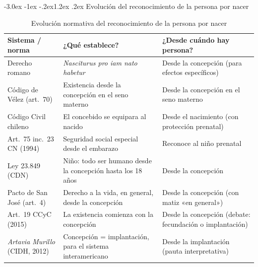 \documentclass[12pt,oneside]{book}
\makeatletter
\renewcommand\section{\@startsection{section}{1}{\z@}%
  {-3.0ex \@plus -1ex \@minus -.2ex}{1.2ex \@plus .2ex}%
  {\normalfont\large\bfseries\color{acento}}}
\makeatother
\begin{document}
\section{Evolución del reconocimiento de la persona por nacer}

\begin{table}[H]
\centering
\small
\begin{tabularx}{\textwidth}{B{0.23\textwidth} Y B{0.26\textwidth}}
\toprule
\textbf{Sistema / norma} & \textbf{¿Qué establece?} & \textbf{¿Desde cuándo hay persona?} \\
\midrule
Derecho romano & \textit{Nasciturus pro iam nato habetur} & Desde la concepción (para efectos específicos) \\
Código de Vélez (art.~70) & Existencia desde la concepción en el seno materno & Desde la concepción en el seno materno \\
Código Civil chileno & El concebido se equipara al nacido & Desde el nacimiento (con protección prenatal) \\
Art.~75 inc.~23 CN (1994) & Seguridad social especial desde el embarazo & Reconoce al niño prenatal \\
Ley 23.849 (CDN) & Niño: todo ser humano desde la concepción hasta los 18 años & Desde la concepción \\
Pacto de San José (art.~4) & Derecho a la vida, en general, desde la concepción & Desde la concepción (con matiz «en general») \\
Art.~19 CCyC (2015) & La existencia comienza con la concepción & Desde la concepción (debate: fecundación o implantación) \\
\textit{Artavia Murillo} (CIDH, 2012) & Concepción = implantación, para el sistema interamericano & Desde la implantación (pauta interpretativa) \\
\bottomrule
\end{tabularx}
\caption{Evolución normativa del reconocimiento de la persona por nacer}
\end{table}
\end{document}
